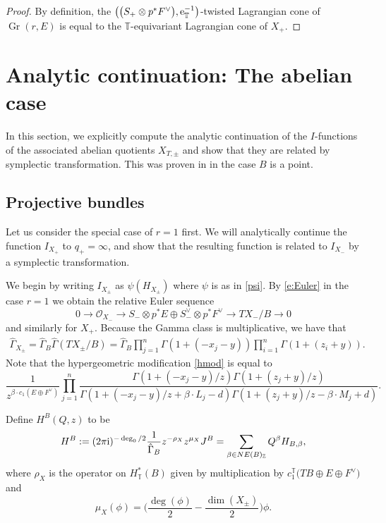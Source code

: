 \documentclass[pdftex]{sigma}
\numberwithin{equation}{section}
\newcommand{\cc}[1]{\mathcal{#1}} %
\newcommand{\ZZ}{\mathbb{Z}}
\newcommand{\torus}{\mathbb{T}}
\DeclareMathOperator{\Gr}{Gr}
\newcommand{\F}{F}
\newcommand{\E}{E}
\newcommand{\MB}{M}
\newcommand{\LB}{L}
\newcommand{\z}{z}
\newcommand{\x}{x}
\newcommand{\y}{y}
\begin{document}
\begin{proof}
By definition, the $\bigl(\bigl(S_+ \otimes p^*\F^\vee\bigr), {\rm e}^{-1}_{\torus}\bigr)$-twisted Lagrangian cone of $\Gr(r, \E)$ is equal to the $\torus$-equivariant Lagrangian cone of $X_+$.
\end{proof}

\section{Analytic continuation: The abelian case}

In this section, we explicitly compute the analytic continuation of the $I$-functions of the associated abelian quotients $X_{T, \pm}$ and show that they are related by symplectic transformation. This was proven in \cite{CIJ} in the case $B$ is a point.

\subsection{Projective bundles}
Let us consider the special case of $r=1$ first. We will analytically continue the function $I_{X_+}$ to $q_+ = \infty$, and show that the resulting function is related to $I_{X_-}$ by a symplectic transformation.

We begin by writing $I_{X_\pm}$ as $\psi (H_{X_\pm})$ where $\psi$ is as in \eqref{psi}.
By \eqref{e:Euler} in the case $r=1$ we obtain the relative Euler sequence
\[
0 \to \cc O_{X_-} \to S_- \otimes p^*E \oplus S_-^\vee \otimes p^*F^\vee \to TX_{-}/B \to 0
\]
and similarly for $X_+$.
Because the Gamma class is multiplicative, we have that
\begin{align*}
\hat \Gamma_{X_\pm} = \hat \Gamma_{B} \hat \Gamma(TX_\pm/B)
 =\hat \Gamma_{B} \prod_{j=1}^n \Gamma(1 + (- \x_j - \y)) \prod_{i=1}^n \Gamma(1 + (\z_i + \y)).
\end{align*}
Note that the hypergeometric modification \eqref{hmod} is equal to
\begin{equation*}\frac{1}{z^{\beta \cdot c_1(\E \oplus \F^\vee)}}\prod_{j=1}^n\frac{ \Gamma(1 + (- \x_j - \y)/z) \Gamma(1 + (\z_j + \y)/z)}{ \Gamma(1 + (- \x_j - \y)/z + \beta \cdot \LB_j-d) \Gamma(1 + (\z_j + \y)/z - \beta \cdot \MB_j + d)}.
\end{equation*}

Define $H^B(Q ,z)$ to be
\begin{align*} H^B := (2 \pi {\rm i})^{-\deg_0/2}\frac{1}{\hat \Gamma_B} z^{- \rho_{X}} z^{\mu_{X}} J^B
 =
\sum_{\beta \in NE(B)_\ZZ} Q^\beta H_{B, \beta},\end{align*}
where $\rho_{X}$ is the operator on $H^*_\torus(B)$ given by multiplication by
$c_1^\torus\bigl(TB \oplus E \oplus F^\vee\bigr)$ and
\[
\mu_{X}(\phi) = \biggl( \frac{\deg(\phi)}{2} -\frac{ \dim(X_\pm)}{2} \biggr) \phi.
\]
\end{document}
